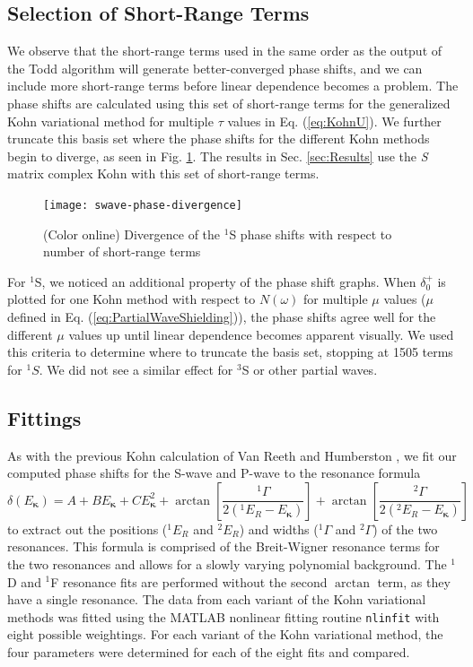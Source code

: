 \documentclass[preprint,showpacs,preprintnumbers,amsmath,amssymb,longbibliography,pra,aps]{revtex4-1}
\begin{document}
\subsection{Selection of Short-Range Terms}
\label{sec:Truncation}
We observe that the short-range terms used in the same order as the output of the Todd algorithm will generate better-converged phase shifts, and we can include more short-range terms before linear dependence becomes a problem. The phase shifts are calculated using this set of short-range terms for the generalized Kohn variational method for multiple $\tau$ values in Eq. (\ref{eq:KohnU}). We further truncate this basis set where the phase shifts for the different Kohn methods begin to diverge, as seen in Fig. \ref{fig:swave-phase-divergence}. The results in Sec. \ref{sec:Results} use the \emph{S} matrix complex Kohn with this set of short-range terms.

\begin{figure}[H]
	\centering
	\texttt{[image: swave-phase-divergence]}
	\caption{(Color online) Divergence of the $^1$S phase shifts with respect to number of short-range terms}
	\label{fig:swave-phase-divergence}
\end{figure}

For $^1$S, we noticed an additional property of the phase shift graphs. When $\delta_0^+$ is plotted for one Kohn method with respect to $N(\omega)$ for multiple $\mu$ values ($\mu$ defined in Eq. (\ref{eq:PartialWaveShielding})), the phase shifts agree well for the different $\mu$ values up until linear dependence becomes apparent visually. We used this criteria to determine where to truncate the basis set, stopping at 1505 terms for $^1S$. We did not see a similar effect for $^3$S or other partial waves.

\subsection{Fittings}
As with the previous Kohn calculation of Van Reeth and Humberston \cite{VanReeth2004}, we fit our computed phase shifts for the S-wave and P-wave to the resonance formula
\begin{equation}
\label{eq:ResonanceFit}
\delta(E_{\bm \kappa}) = A + B E_{\bm \kappa} + C E_{\bm \kappa}^2 + \arctan \left[ \frac{^1\Gamma}{2(^1E_R - E_{\bm \kappa})} \right] + \arctan \left[ \frac{^2\Gamma}{2(^2E_R - E_{\bm \kappa})} \right]
\end{equation}
to extract out the positions ($^1E_R$ and $^2E_R$) and widths
($^1\Gamma$ and $^2\Gamma$) of the two resonances. 
This formula is comprised of the Breit-Wigner resonance
terms \cite{Bransden2003} for the two resonances and allows for a slowly varying polynomial
background. The $^1$D and $^1$F resonance fits are performed without the second $\arctan$ term, as they have a single resonance. 
The data from each variant of the Kohn variational methods was fitted using the MATLAB \cite{MATLAB} nonlinear fitting routine \texttt{nlinfit} with eight possible weightings.
For each variant of the Kohn variational method, the four parameters were determined for each of the eight fits and compared.
\end{document}
